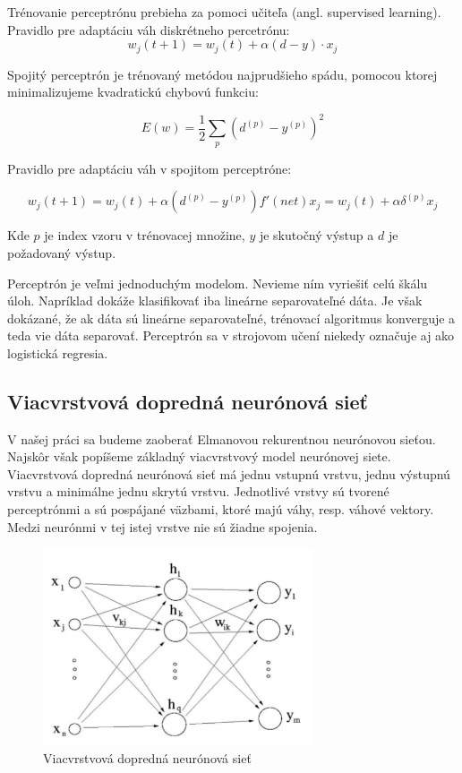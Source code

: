 Trénovanie perceptrónu prebieha za pomoci učiteľa (angl. supervised learning).
Pravidlo pre adaptáciu váh diskrétneho percetrónu:
\begin{equation}
	w_j(t+1) = w_j(t) + \alpha (d - y)\cdot x_j
\end{equation}

Spojitý perceptrón je trénovaný metódou najprudšieho spádu, pomocou
ktorej minimalizujeme kvadratickú chybovú funkciu:

\begin{equation}
	E(w) = \frac{1}{2}\sum_{p}\left(d^{(p)} - y^{(p)}\right)^{2} 
\end{equation}

Pravidlo pre adaptáciu váh v spojitom perceptróne:

\begin{equation}
	w_{j}(t+1) = w_{j}(t) + \alpha (d^{(p)} - y^{(p)})f'(net)x_{j} = w_{j}(t) + \alpha \delta^{(p)}x_{j}
\end{equation}

Kde $p$ je index vzoru v trénovacej množine, $y$ je skutočný výstup a $d$ je požadovaný výstup.

Perceptrón je veľmi jednoduchým modelom. 
Nevieme ním vyriešiť celú škálu úloh. Napríklad dokáže klasifikovať 
iba lineárne separovateľné dáta. Je však dokázané, že ak dáta sú lineárne separovateľné, trénovací algoritmus
konverguje a teda vie dáta separovať.
Perceptrón sa v strojovom učení niekedy označuje aj ako logistická regresia.

\subsection{Viacvrstvová dopredná neurónová sieť}
V našej práci sa budeme zaoberať Elmanovou rekurentnou neurónovou sieťou. \cite{Elman90findingstructure} Najskôr však popíšeme základný viacvrstvový model
neurónovej siete. 
Viacvrstvová dopredná neurónová sieť má jednu vstupnú vrstvu, jednu výstupnú vrstvu a minimálne jednu skrytú vrstvu. 
Jednotlivé vrstvy sú tvorené perceptrónmi a sú pospájané väzbami, ktoré majú váhy, resp. váhové vektory. 
Medzi neurónmi v tej istej vrstve nie sú žiadne spojenia.

\begin{figure}[H]
	\centering
	\includegraphics[width=8cm]{assets/mlp}
	\caption{Viacvrstvová dopredná neurónová sieť}
\end{figure}

